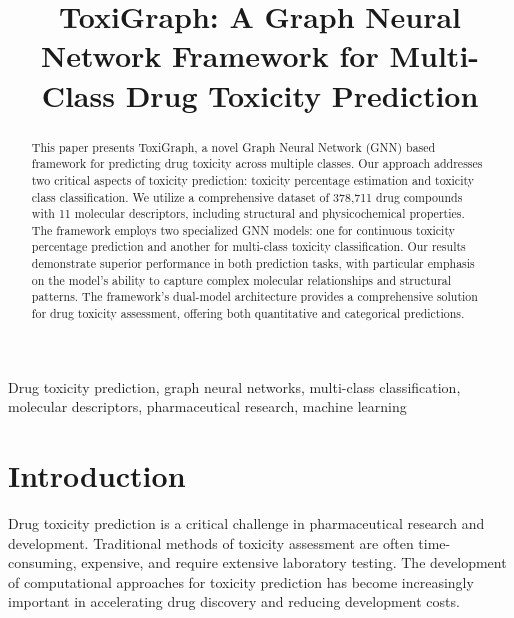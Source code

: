 \documentclass[conference]{IEEEtran}
\begin{document}
\title{ToxiGraph: A Graph Neural Network Framework for Multi-Class Drug Toxicity Prediction}

\author{
}

\maketitle

\begin{abstract}
This paper presents ToxiGraph, a novel Graph Neural Network (GNN) based framework for predicting drug toxicity across multiple classes. Our approach addresses two critical aspects of toxicity prediction: toxicity percentage estimation and toxicity class classification. We utilize a comprehensive dataset of 378,711 drug compounds with 11 molecular descriptors, including structural and physicochemical properties. The framework employs two specialized GNN models: one for continuous toxicity percentage prediction and another for multi-class toxicity classification. Our results demonstrate superior performance in both prediction tasks, with particular emphasis on the model's ability to capture complex molecular relationships and structural patterns. The framework's dual-model architecture provides a comprehensive solution for drug toxicity assessment, offering both quantitative and categorical predictions.
\end{abstract}

\begin{IEEEkeywords}
Drug toxicity prediction, graph neural networks, multi-class classification, molecular descriptors, pharmaceutical research, machine learning
\end{IEEEkeywords}

\section{Introduction}
Drug toxicity prediction is a critical challenge in pharmaceutical research and development. Traditional methods of toxicity assessment are often time-consuming, expensive, and require extensive laboratory testing. The development of computational approaches for toxicity prediction has become increasingly important in accelerating drug discovery and reducing development costs.
\end{document}
